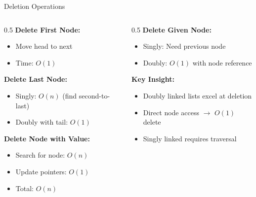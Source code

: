 \documentclass[aspectratio=169,xcolor=dvipsnames]{beamer}
\begin{document}
\begin{frame}{Deletion Operations}
  \begin{columns}
    \begin{column}{0.5\textwidth}
      \textbf{Delete First Node:}
      \begin{itemize}
        \item Move head to next
        \item Time: $O(1)$
      \end{itemize}

      \vspace{0.3cm}
      \textbf{Delete Last Node:}
      \begin{itemize}
        \item Singly: $O(n)$ (find second-to-last)
        \item Doubly with tail: $O(1)$
      \end{itemize}

      \vspace{0.3cm}
      \textbf{Delete Node with Value:}
      \begin{itemize}
        \item Search for node: $O(n)$
        \item Update pointers: $O(1)$
        \item Total: $O(n)$
      \end{itemize}
    \end{column}

    \begin{column}{0.5\textwidth}
      \textbf{Delete Given Node:}
      \begin{itemize}
        \item Singly: Need previous node
        \item Doubly: $O(1)$ with node reference
      \end{itemize}

      \vspace{0.3cm}
      \textbf{Key Insight:}
      \begin{itemize}
        \item Doubly linked lists excel at deletion
        \item Direct node access $\to$ $O(1)$ delete
        \item Singly linked requires traversal
      \end{itemize}
    \end{column}
  \end{columns}
\end{frame}
\end{document}
